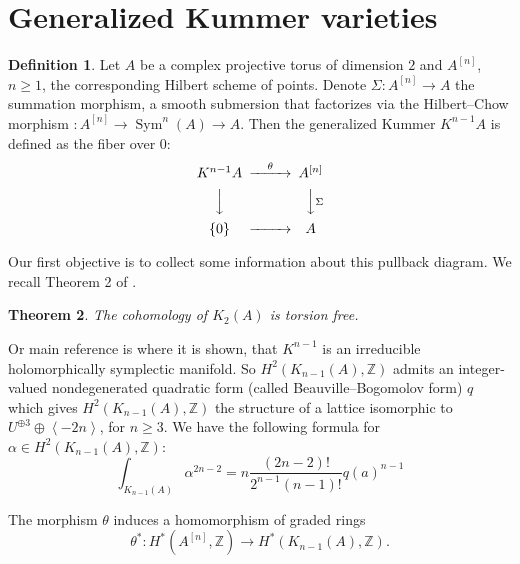 \documentclass{amsart}
\DeclareMathOperator{\Sym}{Sym}
\newcommand{\hilb}[1]{^{[#1]}}
\newcommand{\kum}[2]{K_{ #2 }( #1 )}
\newcommand{\Z}{\mathbb{Z}}
\theoremstyle{plain}
\newtheorem{theorem}{Theorem}[section]
\theoremstyle{definition}
\newtheorem{definition}[theorem]{Definition}
\theoremstyle{remark}
\begin{document}
\section{Generalized Kummer varieties}
\begin{definition}
Let $A$ be a complex projective torus of dimension $2$ and $A\hilb{n}$, $n\geq 1$, the corresponding Hilbert scheme of points. Denote $\Sigma : A\hilb{n} \rightarrow A$ the summation morphism, a smooth submersion that factorizes via the Hilbert--Chow morphism $: A\hilb{n}\rightarrow\Sym^n(A)\rightarrow A$. Then the generalized Kummer $K^{n-1} A $ is defined as the fiber over $0$:
\begin{equation}\label{square}
\begin{CD}
K^{n-1}A @>\theta >> A\hilb{n}\\
@VVV @VV\Sigma V\\
\{0\} @> >> A
\end{CD}
\end{equation}
\end{definition}
Our first objective is to collect some information about this pullback diagram. 
We recall Theorem 2 of \cite{Spanier}.
\begin{theorem}\label{torsion}
The cohomology of $K_{2}(A)$ is torsion free. 
\end{theorem}
Or main reference is \cite{Beauville} where it is shown, that $K^{n-1}$ is an irreducible holomorphically symplectic manifold. So $H^2(\kum{A}{n-1},\Z)$ admits an integer-valued nondegenerated quadratic form (called Beauville--Bogomolov form) $q$ which gives $H^2(\kum{A}{n-1},\Z)$ the structure of a lattice isomorphic to $U^{\oplus 3}\oplus \left< -2n \right>$, for $n\geq 3$. We have the following formula for $\alpha\in H^2(\kum{A}{n-1},\Z)$:
\begin{equation} \label{fujiki}
\int_{\kum{A}{n-1}} \alpha^{2n-2} = n\frac{(2n-2)!}{2^{n-1}(n-1)!} q(a)^{n-1}
\end{equation}


The morphism $\theta$ induces a homomorphism of graded rings
\begin{equation}
\theta^* :H^*(A\hilb{n},\Z)\longrightarrow H^*(\kum{A}{n-1},\Z).
\end{equation}
\end{document}
